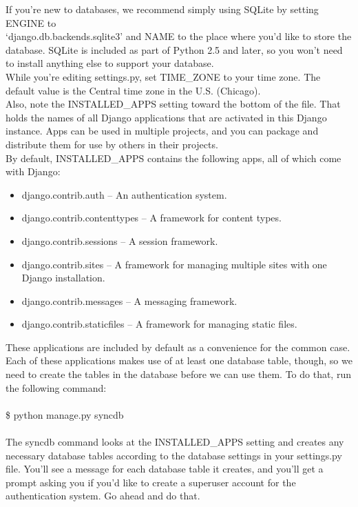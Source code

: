 If you're new to databases, we recommend simply using SQLite by setting ENGINE to \\`django.db.backends.sqlite3' and NAME to the place where you'd like to store the database. SQLite is included as part of Python 2.5 and later, so you won't need to install anything else to support your database.\\

While you're editing settings.py, set TIME\_ZONE to your time zone. The default value is the Central time zone in the U.S. (Chicago).\\

Also, note the INSTALLED\_APPS setting toward the bottom of the file. That holds the names of all Django applications that are activated in this Django instance. Apps can be used in multiple projects, and you can package and distribute them for use by others in their projects.\\

By default, INSTALLED\_APPS contains the following apps, all of which come with Django:\\
\begin{itemize}
\item django.contrib.auth -- An authentication system.
\item django.contrib.contenttypes -- A framework for content types.
\item django.contrib.sessions -- A session framework.
\item django.contrib.sites -- A framework for managing multiple sites with one Django installation.
\item django.contrib.messages -- A messaging framework.
\item django.contrib.staticfiles -- A framework for managing static files.
\end{itemize}

These applications are included by default as a convenience for the common case.\\

Each of these applications makes use of at least one database table, though, so we need to create the tables in the database before we can use them. To do that, run the following command:\\\\

\$ python manage.py syncdb\\\\

The syncdb command looks at the INSTALLED\_APPS setting and creates any necessary database tables according to the database settings in your settings.py file. You'll see a message for each database table it creates, and you'll get a prompt asking you if you'd like to create a superuser account for the authentication system. Go ahead and do that.\\

